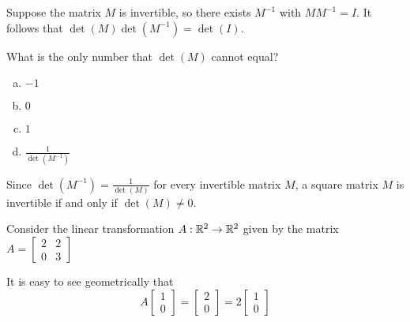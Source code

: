 
\begin{applicationActivities}{3}{27}

\begin{activity}{5}
  Suppose the matrix \(M\) is invertible, so there exists \(M^{-1}\)
  with \(MM^{-1}=I\). It follows that \(\det(M)\det(M^{-1})=\det(I)\).

  What is the only number that \(\det(M)\) cannot equal?
  \begin{multicols}{4}
  \begin{enumerate}[(a)]
  \item \(-1\)
  \item \(0\)
  \item \(1\)
  \item \(\frac{1}{\det(M^{-1})}\)
  \end{enumerate}
  \end{multicols}
\end{activity}

\begin{fact}
  Since \(\det(M^{-1})=\frac{1}{\det(M)}\) for every invertible matrix \(M\),
  a square matrix \(M\) is invertible if and only if \(\det(M)\not=0\).
\end{fact}

\begin{observation}
Consider the linear transformation $A : \mathbb{R}^2 \rightarrow \mathbb{R}^2$ given by the matrix $A = \begin{bmatrix} 2 & 2 \\ 0 & 3 \end{bmatrix}$

\begin{center}
\end{center}
It is easy to see geometrically that  $$ A\begin{bmatrix}1 \\ 0 \end{bmatrix} = \begin{bmatrix}2 \\ 0 \end{bmatrix}= 2 \begin{bmatrix}1 \\ 0 \end{bmatrix}$$


\end{observation}
\end{applicationActivities}
